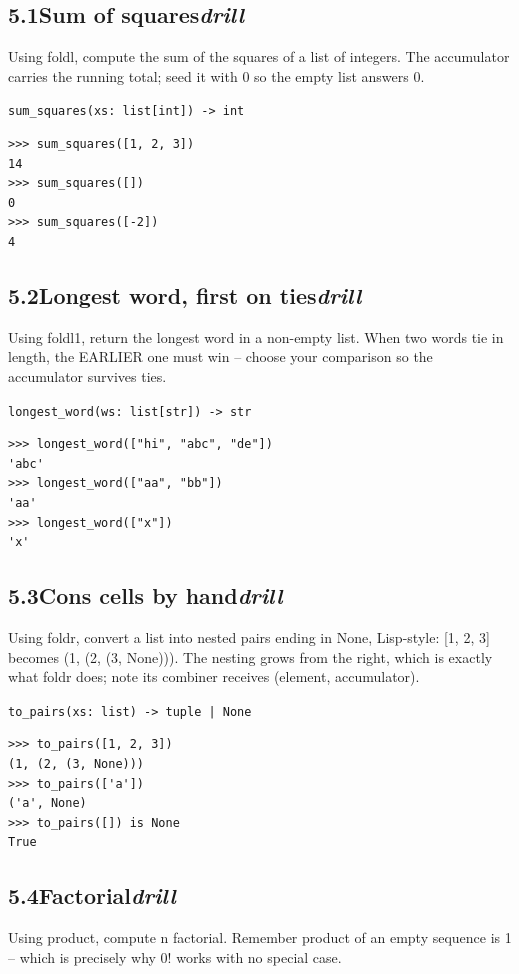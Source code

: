 \documentclass[10pt,letterpaper]{book}
\begin{document}
\subsection*{5.1\quad Sum of squares\hfill\textnormal{\textit{drill}}}
Using foldl, compute the sum of the squares of a list of integers. The accumulator carries the running total; seed it with 0 so the empty list answers 0.

\noindent\texttt{sum\_squares(xs: list[int]) -> int}
\begin{lstlisting}[style=ex]
>>> sum_squares([1, 2, 3])
14
>>> sum_squares([])
0
>>> sum_squares([-2])
4
\end{lstlisting}
\subsection*{5.2\quad Longest word, first on ties\hfill\textnormal{\textit{drill}}}
Using foldl1, return the longest word in a non-empty list. When two words tie in length, the EARLIER one must win -- choose your comparison so the accumulator survives ties.

\noindent\texttt{longest\_word(ws: list[str]) -> str}
\begin{lstlisting}[style=ex]
>>> longest_word(["hi", "abc", "de"])
'abc'
>>> longest_word(["aa", "bb"])
'aa'
>>> longest_word(["x"])
'x'
\end{lstlisting}
\subsection*{5.3\quad Cons cells by hand\hfill\textnormal{\textit{drill}}}
Using foldr, convert a list into nested pairs ending in None, Lisp-style: [1, 2, 3] becomes (1, (2, (3, None))). The nesting grows from the right, which is exactly what foldr does; note its combiner receives (element, accumulator).

\noindent\texttt{to\_pairs(xs: list) -> tuple | None}
\begin{lstlisting}[style=ex]
>>> to_pairs([1, 2, 3])
(1, (2, (3, None)))
>>> to_pairs(['a'])
('a', None)
>>> to_pairs([]) is None
True
\end{lstlisting}
\subsection*{5.4\quad Factorial\hfill\textnormal{\textit{drill}}}
Using product, compute n factorial. Remember product of an empty sequence is 1 -- which is precisely why 0! works with no special case.
\end{document}

